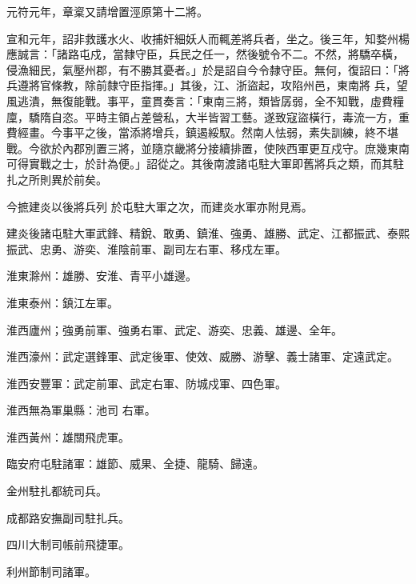 \begin{pinyinscope}
 元符元年，章楶又請增置涇原第十二將。



 宣和元年，詔非救護水火、收捕奸細妖人而輒差將兵者，坐之。後三年，知婺州楊應誠言：「諸路屯戍，當隸守臣，兵民之任一，然後號令不二。不然，將驕卒橫，侵漁細民，氣壓州郡，有不勝其憂者。」於是詔自今令隸守臣。無何，復詔曰：「將兵遵將官條教，除前隸守臣指揮。」其後，江、浙盜起，攻陷州邑，東南將
 兵，望風逃潰，無復能戰。事平，童貫奏言：「東南三將，類皆孱弱，全不知戰，虛費糧廩，驕隋自恣。平時主領占差營私，大半皆習工藝。遂致寇盜橫行，毒流一方，重費經畫。今事平之後，當添將增兵，鎮遏綏馭。然南人怯弱，素失訓練，終不堪戰。今欲於內郡別置三將，並隨京畿將分接續排置，使陜西軍更互戍守。庶幾東南可得實戰之士，於計為便。」詔從之。其後南渡諸屯駐大軍即舊將兵之類，而其駐扎之所則異於前矣。



 今摭建炎以後將兵列
 於屯駐大軍之次，而建炎水軍亦附見焉。



 建炎後諸屯駐大軍武鋒、精銳、敢勇、鎮淮、強勇、雄勝、武定、江都振武、泰熙振武、忠勇、游奕、淮陰前軍、副司左右軍、移戍左軍。



 淮東滁州：雄勝、安淮、青平小雄邊。



 淮東泰州：鎮江左軍。



 淮西廬州；強勇前軍、強勇右軍、武定、游奕、忠義、雄邊、全年。



 淮西濠州：武定選鋒軍、武定後軍、使效、威勝、游擊、義士諸軍、定遠武定。



 淮西安豐軍：武定前軍、武定右軍、防城戍軍、四色軍。



 淮西無為軍巢縣：池司
 右軍。



 淮西黃州：雄關飛虎軍。



 臨安府屯駐諸軍：雄節、威果、全捷、龍騎、歸遠。



 金州駐扎都統司兵。



 成都路安撫副司駐扎兵。



 四川大制司帳前飛捷軍。



 利州節制司諸軍。




\end{pinyinscope}
